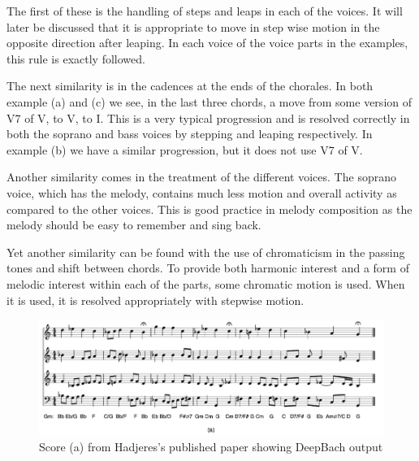\vspace{\baselineskip}

The first of these is the handling of steps and leaps in each of the voices.  It will later be discussed that it is appropriate to move in step wise motion in the opposite direction after leaping.  In each voice of the voice parts in the examples, this rule is exactly followed.

\vspace{\baselineskip}

The next similarity is in the cadences at the ends of the chorales.  In both example (a) and (c) we see, in the last three chords, a move from some version of V7 of V, to V, to I.  This is a very typical progression and is resolved correctly in both the soprano and bass voices by stepping and leaping respectively.  In example (b) we have a similar progression, but it does not use V7 of V.

\vspace{\baselineskip}

Another similarity comes in the treatment of the different voices.  The soprano voice, which has the melody, contains much less motion and overall activity as compared to the other voices.  This is good practice in melody composition as the melody should be easy to remember and sing back.

\vspace{\baselineskip}

Yet another similarity can be found with the use of chromaticism in the passing tones and shift between chords.  To provide both harmonic interest and a form of melodic interest within each of the parts, some chromatic motion is used.  When it is used, it is resolved appropriately with stepwise motion.

\pagebreak

\begin{figure}[!htbp]
	\centering
	\caption{Score (a) from Hadjeres's published paper showing DeepBach output \cite{Hadjeres_2016}}
	\includegraphics[scale=0.3]{images/deepbachOutputA.png}
\end{figure}

